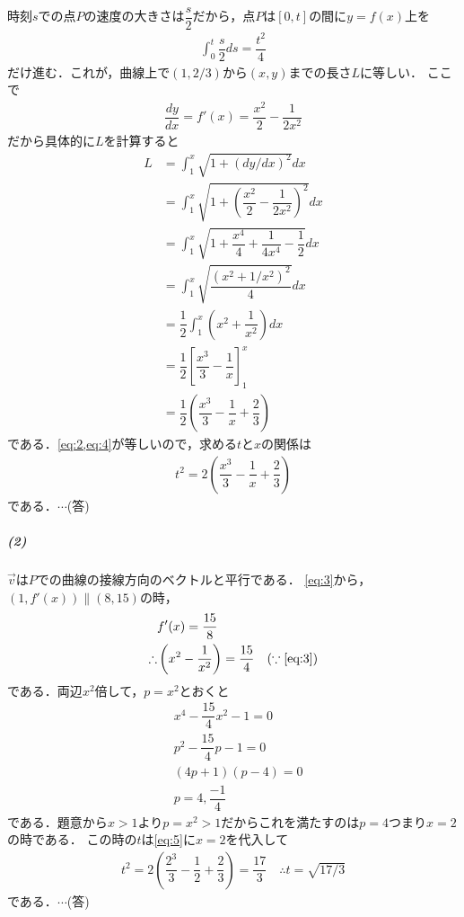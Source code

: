 \documentclass[../../main.tex]{subfiles}
\begin{document}
時刻$s$での点$P$の速度の大きさは$\dfrac{s}{2}$だから，点$P$は$[0,t]$の間に$y=f(x)$上を
\begin{align}
  \int_0^t\dfrac{s}{2}ds=\dfrac{t^2}{4} \label{eq:2}
\end{align}
だけ進む．これが，曲線上で$(1,2/3)$から$(x,y)$までの長さ$L$に等しい．
ここで
\begin{align}
  \dfrac{dy}{dx} = f'(x) = \dfrac{x^2}{2} - \dfrac{1}{2x^2} \label{eq:3}
\end{align}
だから具体的に$L$を計算すると
\begin{align}
  L
  &=\int_{1}^{x}\sqrt{1+(dy/dx)^2}dx \nonumber\\
  &=\int_{1}^{x}\sqrt{1+\left(\dfrac{x^2}{2} - \dfrac{1}{2x^2}\right)^2}dx \nonumber\\
  &=\int_{1}^{x}\sqrt{1+\dfrac{x^4}{4} + \dfrac{1}{4x^4} - \dfrac{1}{2}}dx \nonumber\\
  &=\int_{1}^{x}\sqrt{\dfrac{(x^2+1/x^2)^2}{4}}dx \nonumber\\
  &=\dfrac{1}{2}\int_{1}^{x}\left(x^2+\dfrac{1}{x^2}\right) dx \nonumber\\
  &=\dfrac{1}{2}\left[\dfrac{x^3}{3}-\dfrac{1}{x}\right]_{1}^{x} \nonumber\\
  &=\dfrac{1}{2}\left(\dfrac{x^3}{3}-\dfrac{1}{x}+\dfrac{2}{3}\right) \label{eq:4}
\end{align}
である．\cref{eq:2,eq:4}が等しいので，求める$t$と$x$の関係は
\begin{align}
  t^2=2\left(\dfrac{x^3}{3}-\dfrac{1}{x}+\dfrac{2}{3}\right) \label{eq:5}
\end{align}
である．$\cdots$(答)

\subparagraph{(2)}

$\vec{v}$は$P$での曲線の接線方向のベクトルと平行である．
\cref{eq:3}から，$(1,f'(x))\parallel(8,15)$の時，
\begin{align}
  &f'(x)=\dfrac{15}{8} \\
  \therefore
  &\left(x^2-\dfrac{1}{x^2}\right)=\dfrac{15}{4} \quad (\because \text{\cref{eq:3}})
\end{align}
である．両辺$x^2$倍して，$p=x^2$とおくと
\begin{align}
  &x^4 - \dfrac{15}{4}x^2 - 1 = 0 \\
  &p^2 - \dfrac{15}{4}p - 1 = 0 \\
  &(4p+1)(p-4)=0 \\
  &p=4,\dfrac{-1}{4}
\end{align}
である．題意から$x>1$より$p=x^2>1$だからこれを満たすのは$p=4$つまり$x=2$の時である．
この時の$t$は\cref{eq:5}に$x=2$を代入して
\begin{align}
  t^2=2\left(\dfrac{2^3}{3}-\dfrac{1}{2}+\dfrac{2}{3}\right)=\dfrac{17}{3}
  \quad \therefore
  t = \sqrt{17/3}
\end{align}
である．$\cdots$(答)

\newpage
\end{document}

